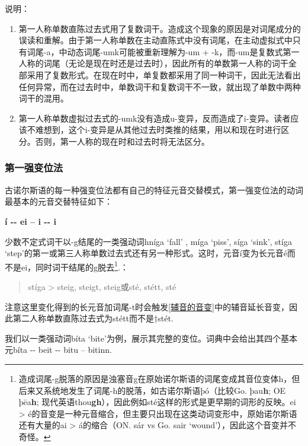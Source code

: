 说明：

\begin{enumerate}
  \def\labelenumi{\arabic{enumi})}
  \item
        \label{_Ref117719619}{}第一人称单数直陈过去式用了复数词干。造成这个现象的原因是对词尾成分的误读和重解。由于第一人称单数在主动直陈式中没有词尾，在主动虚拟式中只有词尾-a，中动态词尾-umk可能被重新理解为-um
        +
        -k，而-um是复数式第一人称的词尾（无论是现在时还是过去时），因此所有的单数第一人称的词干全部采用了复数形式。在现在时中，单复数都采用了同一种词干，因此无法看出任何异常，而在过去时中，单数词干和复数词干不一致，就出现了单数中两种词干的混用。
  \item
        第一人称单数虚拟过去式的-umk没有造成u-变异，反而造成了i-变异。读者应该不难想到，这个i-变异是从其他过去时类推的结果，用以和现在时进行区分。否则，第一人称的现在时和过去时将无法区分。
\end{enumerate}

\subsubsection{第一强变位法}\label{第一强变位法}

古诺尔斯语的每一种强变位法都有自己的特征元音交替模式，第一强变位法的动词最基本的元音交替特征如下：

\textbf{í -\/- ei -- i -\/- i}

少数不定式词干以-g结尾的一类强动词hníga `fall' , míga `piss', síga
`sink', stíga
`step'的第一或第三人称单数过去式还有另一种形式。这时，元音í变为长元音é而不是ei，同时词干结尾的g脱去\footnote{造成词尾-g脱落的原因是浊塞音g在原始诺尔斯语的词尾变成其音位变体h，但后来又系统地发生了词尾-h的脱落，如古诺尔斯语þó（比较Go.
  þau\textbf{h}; OE þēa\textbf{h};
  现代英语thou\textbf{gh}），因此例如sté这样的形式是更早期的词形的反映。ei
  \textgreater{}
  é的音变是一种元音缩合，但主要只出现在这类动词变形中，原始诺尔斯语还有大量的ai
  \textgreater{} á的缩合（ON. sár vs Go. sair
  `wound'），因此这个音变并不奇怪。}.：

\begin{quote}
  stíga \textgreater{} steig, steigt, steig或sté, stétt, sté
\end{quote}

注意这里变化得到的长元音加词尾-t时会触发\ref{辅音的音变}中的辅音延长音变，因此第二人称单数直陈过去式为stétt而不是†stét.

我们以一类强动词bíta
`bite'为例，展示其完整的变位。词典中会给出其四个基本元bíta -\/- beit
-\/- bitu -- bitinn.

